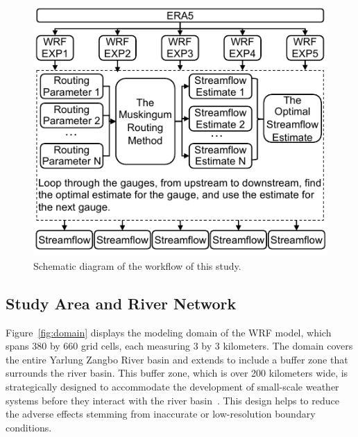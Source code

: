 \documentclass[draft]{agujournal2019}
\begin{document}
\begin{figure}[h!]
      \centering
      \noindent\includegraphics[width=140mm]{workflow.pdf}
      \caption{Schematic diagram of the workflow of this study.}
      \label{fig:workflow}
\end{figure}

\subsection{Study Area and River Network}
\label{sec:domain}

Figure~\ref{fig:domain} displays the modeling domain of the WRF model, which spans 380 by 660 grid cells, each measuring 3 by 3 kilometers. The domain covers the entire Yarlung Zangbo River basin and extends to include a buffer zone that surrounds the river basin. This buffer zone, which is over 200 kilometers wide, is strategically designed to accommodate the development of small-scale weather systems before they interact with the river basin~\cite{denis2002CD}. This design helps to reduce the adverse effects stemming from inaccurate or low-resolution boundary conditions.
\end{document}
